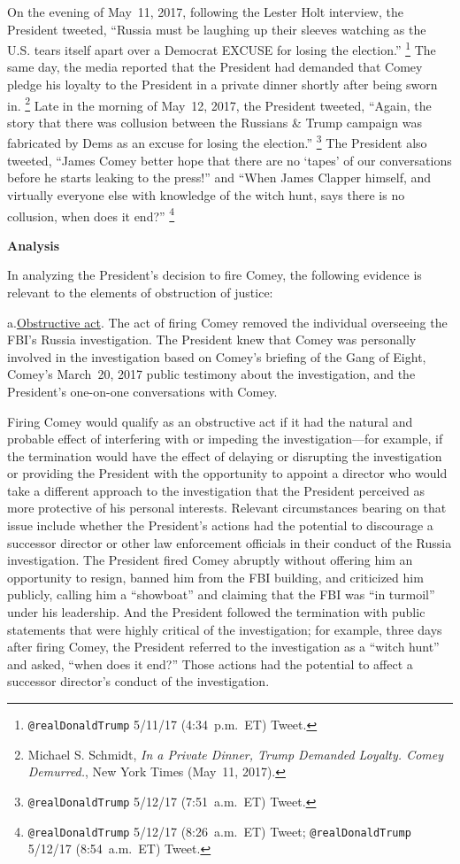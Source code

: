 On the evening of May~11, 2017, following the Lester Holt interview, the President tweeted, ``Russia must be laughing up their sleeves watching as the U.S. tears itself apart over a Democrat EXCUSE for losing the election.''%
\footnote{\verb+@realDonaldTrump+ 5/11/17 (4:34~p.m.~ET) Tweet.}
The same day, the media reported that the President had demanded that Comey pledge his loyalty to the President in a private dinner shortly after being sworn in.%
\footnote{Michael S. Schmidt, \textit{In a Private Dinner, Trump Demanded Loyalty. Comey Demurred.}, New York Times (May~11, 2017).}
Late in the morning of May~12, 2017, the President tweeted, ``Again, the story that there was collusion between the Russians \& Trump campaign was fabricated by Dems as an excuse for losing the election.''%
\footnote{\verb+@realDonaldTrump+ 5/12/17 (7:51~a.m.~ET) Tweet.}
The President also tweeted, ``James Comey better hope that there are no `tapes' of our conversations before he starts leaking to the press!'' and ``When James Clapper himself, and virtually everyone else with knowledge of the witch hunt, says there is no collusion, when does it end?''%
\footnote{\verb+@realDonaldTrump+ 5/12/17 (8:26~a.m.~ET) Tweet;
\verb+@realDonaldTrump+ 5/12/17 (8:54~a.m.~ET) Tweet.}

\begin{center}
\textbf{Analysis}
\end{center}

In analyzing the President's decision to fire Comey, the following evidence is relevant to the elements of obstruction of justice:

a.\qquad\underline{Obstructive act}.
The act of firing Comey removed the individual overseeing the FBI's Russia investigation.
The President knew that Comey was personally involved in the investigation based on Comey's briefing of the Gang of Eight, Comey's March~20, 2017 public testimony about the investigation, and the President's one-on-one conversations with Comey.

Firing Comey would qualify as an obstructive act if it had the natural and probable effect of interfering with or impeding the investigation---for example, if the termination would have the effect of delaying or disrupting the investigation or providing the President with the opportunity to appoint a director who would take a different approach to the investigation that the President perceived as more protective of his personal interests.
Relevant circumstances bearing on that issue include whether the President's actions had the potential to discourage a successor director or other law enforcement officials in their conduct of the Russia investigation.
The President fired Comey abruptly without offering him an opportunity to resign, banned him from the FBI building, and criticized him publicly, calling him a ``showboat'' and claiming that the FBI was ``in turmoil'' under his leadership.
And the President followed the termination with public statements that were highly critical of the investigation;
for example, three days after firing Comey, the President referred to the investigation as a ``witch hunt'' and asked, ``when does it end?''
Those actions had the potential to affect a successor director's conduct of the investigation.

